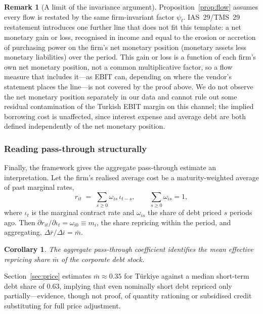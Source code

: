 \documentclass[review,12pt,authoryear]{elsarticle}
\theoremstyle{plain}
\newtheorem{corollary}[proposition]{Corollary}
\theoremstyle{definition}
\newtheorem{remark}{Remark}
\begin{document}
\begin{remark}[A limit of the invariance argument]
\label{rem:monetarygainloss}
Proposition~\ref{prop:flow} assumes every flow is restated by the same
firm-invariant factor $\psi_t$. IAS~29/TMS~29 restatement introduces one
further line that does not fit this template: a net monetary gain or loss,
recognised in income and equal to the erosion or accretion of purchasing
power on the firm's net monetary position (monetary assets less monetary
liabilities) over the period. This gain or loss is a function of each firm's
own net monetary position, not a common multiplicative factor, so a flow
measure that includes it---as EBIT can, depending on where the vendor's
statement places the line---is not covered by the proof above. We do not
observe the net monetary position separately in our data and cannot rule out
some residual contamination of the Turkish EBIT margin on this channel; the
implied borrowing cost is unaffected, since interest expense and average debt
are both defined independently of the net monetary position.
\end{remark}

\subsubsection{Reading pass-through structurally}

Finally, the framework gives the aggregate pass-through estimate an
interpretation. Let the firm's realised average cost be a maturity-weighted
average of past marginal rates,
\begin{equation}
r_{it} \;=\; \sum_{s\ge0}\omega_{is}\,\iota_{t-s},
\qquad \sum_{s\ge0}\omega_{is}=1,
\end{equation}
where $\iota_t$ is the marginal contract rate and $\omega_{is}$ the share of
debt priced $s$ periods ago. Then $\partial r_{it}/\partial\iota_t=\omega_{i0}
\equiv m_i$, the share repricing within the period, and aggregating,
$\Delta\bar{r}/\Delta\bar{\iota}=\bar{m}$.

\begin{corollary}
\label{cor:passthrough}
The aggregate pass-through coefficient identifies the mean effective repricing
share $\bar{m}$ of the corporate debt stock.
\end{corollary}

Section~\ref{sec:price} estimates $\bar{m}\approx0.35$ for T\"{u}rkiye against a
median short-term debt share of $0.63$, implying that even nominally short debt
repriced only partially---evidence, though not proof, of quantity rationing or
subsidised credit substituting for full price adjustment.
\end{document}
